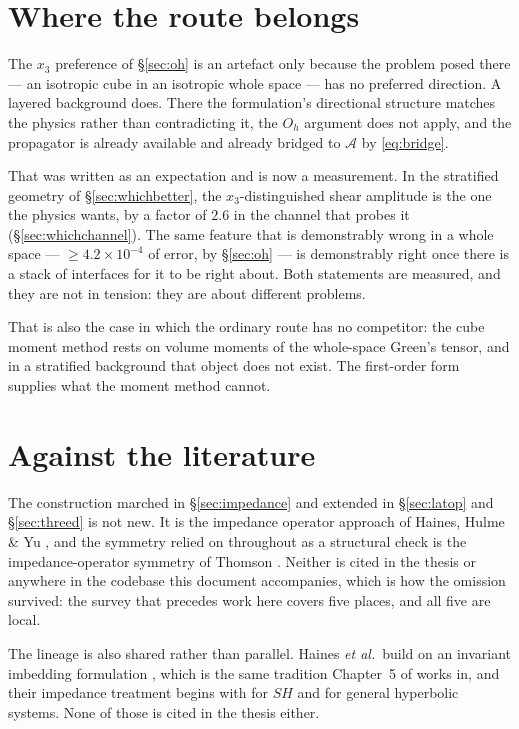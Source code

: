 \documentclass[11pt,a4paper]{article}
\newcommand{\Aop}{\mathcal{A}}
\newcommand{\Oh}{O_{h}}
\begin{document}
\section{Where the route belongs}

The $x_3$ preference of \S\ref{sec:oh} is an artefact only because the problem
posed there --- an isotropic cube in an isotropic whole space --- has no
preferred direction.  A layered background does.  There the formulation's
directional structure matches the physics rather than contradicting it, the
$\Oh$ argument does not apply, and the propagator is already available and
already bridged to $\Aop$ by \eqref{eq:bridge}.

That was written as an expectation and is now a measurement.  In the stratified
geometry of \S\ref{sec:whichbetter}, the $x_3$-distinguished shear amplitude is
the one the physics wants, by a factor of $2.6$ in the channel that probes it
(\S\ref{sec:whichchannel}).  The same feature that is demonstrably wrong in a
whole space --- $\ge4.2\times10^{-4}$ of error, by \S\ref{sec:oh} --- is
demonstrably right once there is a stack of interfaces for it to be right about.
Both statements are measured, and they are not in tension: they are about
different problems.

That is also the case in which the ordinary route has no competitor: the cube
moment method rests on volume moments of the whole-space Green's tensor, and in
a stratified background that object does not exist.  The first-order form
supplies what the moment method cannot.

\section{Against the literature}\label{sec:priorart}

The construction marched in \S\ref{sec:impedance} and extended in
\S\ref{sec:latop} and \S\ref{sec:threed} is not new.  It is the impedance
operator approach of Haines, Hulme \& Yu \cite{haines2004}, and the symmetry relied on
throughout as a structural check is the impedance-operator symmetry of Thomson
\cite{thomson2015a,thomson2015b}.  Neither is cited in the thesis or anywhere in the codebase this
document accompanies, which is how the omission survived: the survey that
precedes work here covers five places, and all five are local.

The lineage is also shared rather than parallel.  Haines \emph{et al.}\ build on an
invariant imbedding formulation \cite{bellman1959,mccoy1986}, which is the same
tradition Chapter~5 of \cite{nestor1996} works in, and their impedance treatment
begins with \cite{haines1989} for $SH$ and \cite{hainesdehoop1996} for general
hyperbolic systems.  None of those is cited in the thesis either.
\end{document}

